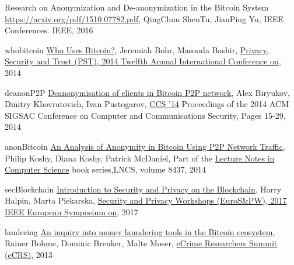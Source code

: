 %
%
%
\begin{thebibliography}{1}

Research on Anonymization and De-anonymization in the Bitcoin System
\url{https://arxiv.org/pdf/1510.07782.pdf}, QingChun ShenTu, JianPing Yu,
IEEE Conferences. IEEE, 2016

\item{whobitcoin}
\href{http://ieeexplore.ieee.org/abstract/document/6890928/}{Who Uses Bitcoin?},
Jeremiah Bohr, Masooda Bashir, 
\href{http://ieeexplore.ieee.org/xpl/mostRecentIssue.jsp?punumber=6883276}
{Privacy, Security and Trust (PST), 2014 Twelfth Annual International
Conference on}, 2014

\item{deanonP2P}
\href{https://arxiv.org/pdf/1405.7418.pdf}{Deanonymisation of clients in
Bitcoin P2P network}, Alex Biryukov, Dmitry Khovratovich, Ivan Pustogarov,
\href{http://www.sigsac.org/ccs/CCS2014/}{CCS '14} Proceedings of the 2014 ACM
SIGSAC Conference on Computer and Communications Security, Pages 15-29, 2014

\item{anonBitcoin}
\href{https://www.ifca.ai/fc14/papers/fc14_submission_71.pdf}{An Analysis of
Anonymity in Bitcoin Using P2P Network Traffic}, Philip Koshy, Diana Koshy,
Patrick McDaniel, Part of the \href{https://link.springer.com/bookseries/558}
{Lecture Notes in Computer Science} book series,LNCS, volume 8437, 2014

\item{secBlockchain}
\href{https://hal.inria.fr/hal-01673293/document}{Introduction to Security and
Privacy on the Blockchain}, Harry Halpin, Marta Piekarska,
\href{http://ieeexplore.ieee.org/xpl/mostRecentIssue.jsp?punumber=7966454}
{Security and Privacy Workshops (EuroS\&PW), 2017 IEEE European Symposium on},
2017

\item{laudering}
\href{http://ieeexplore.ieee.org/document/6805780/}{An inquiry into money
laundering tools in the Bitcoin ecosystem}, Rainer Bohme, Dominic Breuker,
Malte Moser,
\href{http://ieeexplore.ieee.org/xpl/mostRecentIssue.jsp?punumber=6802823}
{eCrime Researchers Summit (eCRS)}, 2013


\end{thebibliography}
